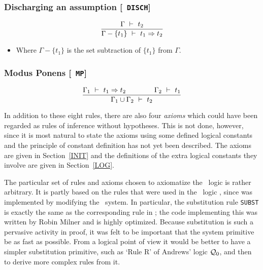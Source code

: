 \subsubsection*{Discharging an assumption [{\small\tt
DISCH}]}
\[
\frac{\Gamma\ \vdash\  t_2}
{\Gamma -\{t_1\} \ \vdash\  t_1 \Rightarrow t_2}
\]
\begin{itemize}
\item Where $\Gamma -\{t_1\}$ is the set subtraction of $\{t_1\}$
from $\Gamma$.
\end{itemize}

\subsubsection*{Modus Ponens [{\small\tt
MP}]}
\[
\frac{\Gamma_1 \ \vdash\  t_1 \Rightarrow t_2  \qquad\qquad   \Gamma_2\ \vdash\  t_1}
{\Gamma_1 \cup \Gamma_2 \ \vdash\  t_2}
\]

In addition to these eight rules, there are also four {\it
axioms\/} which could have been
regarded as rules of inference without hypotheses. This is not done,
however, since it is most natural to state the axioms using some
defined logical constants and the principle of constant definition has
not yet been described.  The axioms are given in Section~\ref{INIT} and
the definitions of the extra logical constants they involve are given in
Section~\ref{LOG}.

The particular set of rules and axioms chosen to axiomatize the \HOL\
logic is rather arbitrary. It is partly based on the rules that were
used in the
\LCF{}\ logic
\PPL{}, since \HOL{} was
implemented by modifying the \LCF\ system. In particular, the
substitution rule {\small\tt SUBST} is exactly
the same as the corresponding rule in \LCF; the code implementing this
was written by Robin Milner and is highly optimized. Because
substitution is such a pervasive activity in proof, it was felt to be
important that the system primitive be as fast as possible. From a
logical point of view it would be better to have a simpler
substitution primitive, such as `Rule R' of Andrews' logic ${\cal
Q}_0$, and then to derive more complex rules from it.

